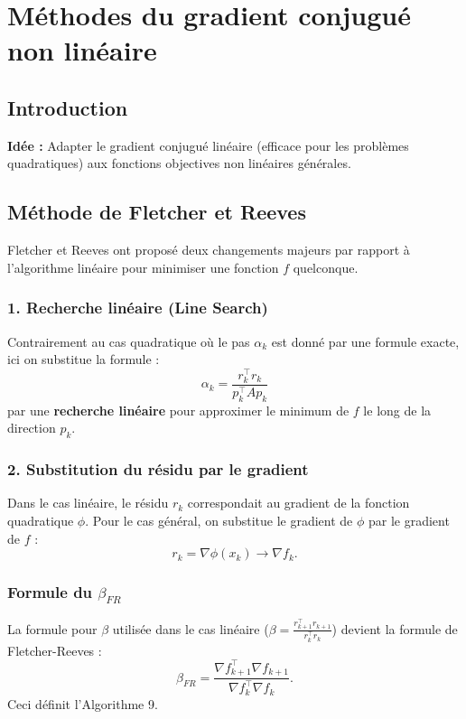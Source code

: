 \chapter{Méthodes du gradient conjugué non linéaire}

\section{Introduction}

\textbf{Idée :} Adapter le gradient conjugué linéaire (efficace pour les problèmes quadratiques) aux fonctions objectives non linéaires générales.

\section{Méthode de Fletcher et Reeves}

Fletcher et Reeves \cite{fletcher1964function} ont proposé deux changements majeurs par rapport à l'algorithme linéaire pour minimiser une fonction $f$ quelconque.

\subsection{1. Recherche linéaire (Line Search)}
Contrairement au cas quadratique où le pas $\alpha_k$ est donné par une formule exacte, ici on substitue la formule :
\[
\alpha_k = \frac{r_k^\top r_k}{p_k^\top A p_k}
\]
par une \textbf{recherche linéaire} pour approximer le minimum de $f$ le long de la direction $p_k$.

\subsection{2. Substitution du résidu par le gradient}
Dans le cas linéaire, le résidu $r_k$ correspondait au gradient de la fonction quadratique $\phi$. Pour le cas général, on substitue le gradient de $\phi$ par le gradient de $f$ :
\[
r_k = \nabla \phi(x_k) \longrightarrow \nabla f_k.
\]

\subsection{Formule du \texorpdfstring{$\beta_{FR}$}{beta\_FR}}
La formule pour $\beta$ utilisée dans le cas linéaire ($\beta = \frac{r_{k+1}^\top r_{k+1}}{r_k^\top r_k}$) devient la formule de Fletcher-Reeves :
\[
\boxed{\beta_{FR} = \frac{\nabla f_{k+1}^\top \nabla f_{k+1}}{\nabla f_k^\top \nabla f_k}}.
\]
Ceci définit l'Algorithme 9.

